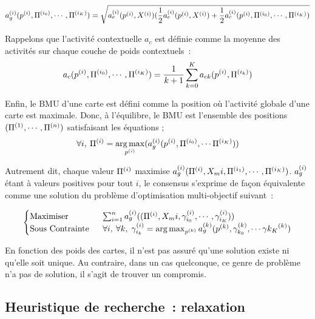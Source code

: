 \documentclass[../main]{subfiles}
\begin{document}
\begin{equation}
	a_g^{({i})}(p^{({i})},\Pi^{({i_0})}, \cdots, \Pi^{({i_K})}) = \sqrt{a_e^{({i})}(p^{({i})},X^{({i})})(\frac{1}{2}a_e^{({i})}(p^{({i})},X^{({i})}) + \frac{1}{2}a_c^{({i})}(p^{({i})},\Pi^{({i_0})}, \cdots, \Pi^{({i_K})})}
\end{equation}

Rappelons que l'activité contextuelle $a_c$ est définie comme la moyenne des activités sur chaque couche de poids contextuels~:
\begin{equation}
	a_c(p^{({i})}, \Pi^{({i_0})}, \cdots, \Pi^{({i_K})}) = \frac{1}{k+1}\sum_{k=0}^{K}{a_{ck}(p^{({i})}, \Pi^{({i_k})})}
\end{equation}

Enfin, le BMU d'une carte est défini comme la position où l'activité globale d'une carte est maximale. Donc, à l'équilibre, le BMU est l'ensemble des positions $(\Pi^{({1})}, \cdots, \Pi^{({n})})$ satisfaisant les équations ; 
\begin{equation}
	\forall i, \: \Pi^{({i})} = \operatorname*{arg\,max}_{p^{({i})}}(a_g^{({i})}(p^{({i})},\Pi^{({i_0})}, \cdots \Pi^{({i_K})}))
\end{equation}

Autrement dit, chaque valeur $\Pi^{({i})}$ maximise $a_g^{({i})}(\Pi^{({i})},X_m{i},\Pi^{({i_1})}, \cdots, \Pi^{({i_K})})$. 
$a_g^{({i})}$ étant à valeurs positives pour tout $i$, le consensus s'exprime de façon équivalente comme une solution du problème d'optimisation multi-objectif suivant~:

\begin{equation}\label{eq:opti}
	\begin{cases}
	\text{Maximiser}\;& \sum_{i = 1}^n a_g^{({i})}((\Pi^{({i})},X_m{i},\gamma_{i_0}^{({i})}, \cdots, \gamma_{i_K}^{({i})})) \\
	\text{Sous Contrainte }\; &\forall i,\:\forall k, \; \gamma_{i_k}^{({i})} = \operatorname*{arg\,max}_{p^{({k})}}a_g^{({k})}(p^{({k})},\gamma_{k_0}^{({k})}, \cdots \gamma{k_K}^{({k})})
	\end{cases}
\end{equation}

En fonction des poids des cartes, il n'est pas assuré qu'une solution existe ni qu'elle soit unique. Au contraire, dans un cas quelconque, ce genre de problème n'a pas de solution, il s'agit de trouver un compromis.


\subsection{Heuristique de recherche~: relaxation}
\end{document}
